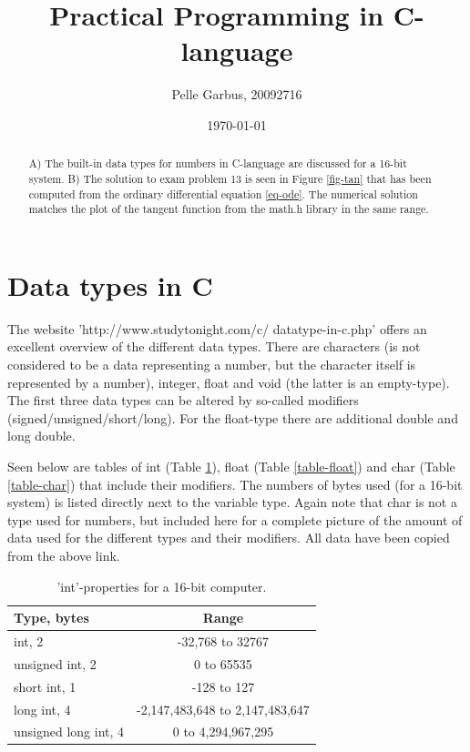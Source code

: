 \documentclass[twocolumn]{article}
\begin{document}
\title{Practical Programming in C-language}
\author{Pelle Garbus, 20092716}
\date{\today}
\maketitle
\begin{abstract}
A) The built-in data types for numbers in C-language are discussed for a 16-bit system. B) The solution to exam problem 13 is seen in Figure \ref{fig-tan} that has been computed from the ordinary differential equation \ref{eq-ode}. The numerical solution matches the plot of the tangent function from the math.h library in the same range.
\end{abstract}



\section{Data types in C}
The website 'http://www.studytonight.com/c/ datatype-in-c.php' offers an excellent overview of the different data types. There are characters (is not considered to be a data representing a number, but the character itself is represented by a number), integer, float and void (the latter is an empty-type). The first three data types can be altered by so-called modifiers (signed/unsigned/short/long). For the float-type there are additional double and long double.

Seen below are tables of int (Table \ref{table-int}), float (Table \ref{table-float}) and char (Table \ref{table-char}) that include their modifiers. The numbers of bytes used (for a 16-bit system) is listed directly next to the variable type. Again note that char is not a type used for numbers, but included here for a complete picture of the amount of data used for the different types and their modifiers. All data have been copied from the above link.

\newpage
\begin{table}[h] \center 
\begin{tabular}{l|c}
Type, bytes				&	Range 							\\\hline
int, 2					&	-32,768 to 32767				\\
unsigned int, 2			&	0 to 65535						\\
short int, 1			&	-128 to 127						\\
long int, 4				&	-2,147,483,648 to 2,147,483,647	\\
unsigned long int, 4	&	0 to 4,294,967,295				
\end{tabular}
\caption{'int'-properties for a 16-bit computer.}
\label{table-int}
\end{table}
\end{document}
